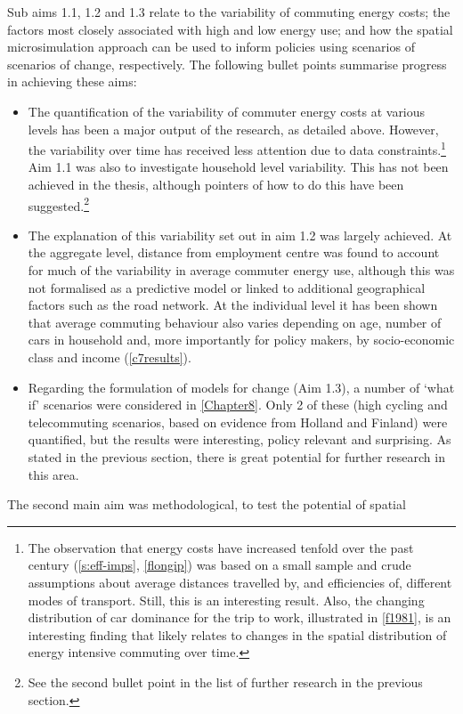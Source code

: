 Sub aims 1.1, 1.2 and 1.3 relate to the variability of commuting energy costs;
the factors most closely associated with high and low energy use; and how the
spatial microsimulation approach can be used to inform policies using scenarios
of scenarios of change, respectively. The following bullet points summarise
progress in achieving these aims:
\begin{itemize}
 \item The quantification of the variability of commuter energy costs at various
levels has been a major output of the research, as detailed above. However, the
variability over time has received less attention due to data
constraints.\footnote{The
observation that energy costs have increased tenfold
over the past century (\cref{s:eff-imps}, \cref{flongip}) was based on a small
sample and crude assumptions about average distances travelled by, and
efficiencies of, different modes of transport. Still, this is an interesting
result. Also, the changing distribution of car dominance for the trip to work,
illustrated in \cref{f1981}, is an interesting finding that likely relates to
changes in the spatial distribution of energy
intensive commuting over time.
}
Aim 1.1 was also to investigate household level variability. This has not been
achieved in the thesis, although pointers of how to do this have been
suggested.\footnote{See
the second bullet point in the list of further research
in the previous section.
}
\item The explanation of this variability set out in aim 1.2 was largely
achieved. At the aggregate level, distance from employment centre was found to
account for much of the variability in average commuter energy use, although
this was not formalised as a predictive model or linked to additional
geographical factors such as the road network. At the individual level it has
been shown that average commuting behaviour also varies depending on age,
number of cars in household and, more importantly for policy makers, by
socio-economic class and income (\cref{c7results}).
\item Regarding the formulation of models for change (Aim 1.3), a number of
`what if' scenarios were considered in \cref{Chapter8}. Only 2 of
these (high cycling and telecommuting scenarios, based on evidence from Holland
and Finland) were quantified, but the results were interesting, policy relevant
and surprising. As stated in the previous section, there is great potential for
further research in this area.
\end{itemize}
The second main aim was methodological, to test the potential of spatial
